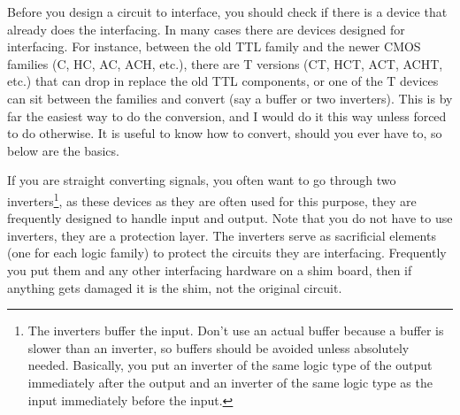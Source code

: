 Before you design a circuit to interface, you should check if there is a device that already does the interfacing.  In many cases there are devices designed for interfacing.  For instance, between the old TTL family and the newer CMOS families (C, HC, AC, ACH, etc.), there are T versions (CT, HCT, ACT, ACHT, etc.) that can drop in replace the old TTL components, or one of the T devices can sit between the families and convert (say a buffer or two inverters).  This is by far the easiest way to do the conversion, and I would do it this way unless forced to do otherwise.  It is useful to know how to convert, should you ever have to, so below are the basics.

If you are straight converting signals, you often want to go through two inverters\footnote{The inverters buffer the input.  Don't use an actual buffer because a buffer is slower than an inverter, so buffers should be avoided unless absolutely needed.  Basically, you put an inverter of the same logic type of the output immediately after the output and an inverter of the same logic type as the input immediately before the input.}, as these devices as they are often used for this purpose, they are frequently designed to handle input and output.  Note that you do not have to use inverters, they are a protection layer.  The inverters serve as sacrificial elements (one for each logic family) to protect the circuits they are interfacing.  Frequently you put them and any other interfacing hardware on a shim board, then if anything gets damaged it is the shim, not the original circuit.

